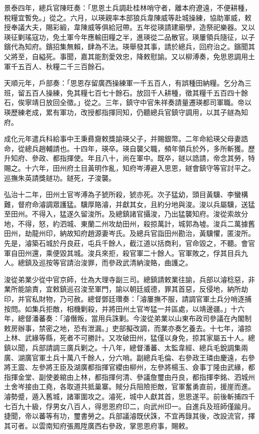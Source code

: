 \begin{pinyinscope}
景泰四年，總兵官陳旺奏：「思恩土兵調赴桂林哨守者，離本府遼遠，不便耕種，稅糧宜暫免。」從之。六月，以瑛親率本部狼兵韋陳威等赴城操練，協助軍威，敕授奉議大夫，賜彩緞，韋陳威等俱給冠帶。五年從瑛請建廟學，造祭祀樂器。又以瑛征剿瑤寇功，免土軍今年應輸田糧之半，進瑛從二品散官。瑛屢領兵隨征，以子鑌代為知府。鑌招集無賴，肆為不法。瑛舉發其事，請於總兵，回府治之。鑌聞其父將至，自縊死。事聞，嘉其能割愛效忠，降敕慰諭。又以柳溥奏，免思恩調用土軍千五百人、秋糧二千三百餘石。

天順元年，戶部奏：「思恩存留廣西操練軍一千五百人，有誤種田納糧。乞分為三班，留五百人操練，免其糧七百七十餘石。放回千人耕種，徵其糧千五百四十餘石，俟寧靖日放回全徵。」從之。三年，鎮守中官朱祥奏請量遷瑛都司軍職。帝以瑛歷練老成，累有軍功，改授都指揮同知，仍聽總兵官鎮守調用，以其子鐩為知府。

成化元年遣兵科給事中王秉彞齎敕獎諭瑛父子，并賜銀幣。二年命給瑛父母妻誥命，從總兵趙輔請也。十四年，瑛卒。瑛自襲父職，頻年領兵於外，多所斬獲。歷升知府、參政、都指揮使。年且八十，尚在軍中。既卒，鐩以誥請，帝念其勞，特賜之。十六年，田州府土目黃明作亂，知府岑溥避入思恩，鐩會鎮守等官討平之。巡撫朱英請獎鐩功。鐩死，子浚襲。

弘治十二年，田州土官岑溥為子猇所殺，猇亦死。次子猛幼，頭目黃驥、李蠻構難，督府命濬調眾護猛。驥厚賂濬，并獻其女，且約分地與浚。浚以兵屬驥，送猛至田州。不得入，猛遂久留浚所。及總鎮諸官攝浚，乃出猛襲知府。浚從索故分地，不得，怒，約泗城、東蘭二州攻劫田州，殺掠萬計，城郭為墟。浚兵二萬據舊田州，劫龍州印，納故知府趙源妻岑氏。及總兵官詣田州勘治，黃驥懼，匿浚所。先是，濬築石城於丹良莊，屯兵千餘人，截江道以括商利，官命毀之，不聽。會官軍自田州還，乘便毀其城。浚兵來拒，殺官軍二十餘人。官軍敗之，俘其目兵九人。總鎮及巡按等官請治浚罪，而參政武清納浚賂，曲護之。

浚從弟業少從中官京師，仕為大理寺副三司。總鎮請敕業往諭，兵部以濬稔惡，非業所能諭責，宜敕鎮巡召浚至軍門，諭以朝廷威德，罪其首惡，反侵地，納所劫印，并官私財物，乃可赦。總督鄧廷瓚奏：「濬屢撫不服，請調官軍土兵分哨逐捕按問。如集兵拒敵，相機剿殺，并將田州土官岑猛一并區處，以靖邊疆。」十六年，總督潘蕃奏：「濬僭叛，當用兵誅剿。今浚從弟業以山東布政司參議在內閣制敕房辦事，禁密之地，恐有泄漏。」吏部擬改調，而業亦奏乞養去。十七年，濬掠上林、武緣等縣，死者不可勝計。又攻破田州，猛僅以身免，掠其家屬五十人。總鎮以聞，兵部請調三廣兵剿之。十八年，總督潘蕃、太監韋經、總兵毛銳調集兩廣、湖廣官軍土兵十萬八千餘人，分六哨。副總兵毛倫、右參政王璘由慶遠，右參將王震、左參將王臣及湖廣都指揮官纓由柳州，左參將楊玉、僉事丁隆由武緣，都指揮金堂、副使姜綰由上林，都指揮何清、參議詹璽由丹良，都指揮李銘、泗城州土舍岑接由工堯，各取道共抵巢寨。賊分兵阻險拒敵，官軍奮勇直前，援崖而進。濬勢蹙，遁入舊城，諸軍圍攻之。濬死，城中人獻其首，思恩遂平。前後斬捕四千七百九十級，俘男女八百人，得思恩府印二，向武州印一。自進兵及班師僅踰月。捷聞，帝以蕃等有功，璽書勞之。兵部議濬既伏誅，不宜再錄其後，改設流官，擇其可者。以雲南知府張鳳陞廣西右參政，掌思恩府事，賜敕。


\end{pinyinscope}
